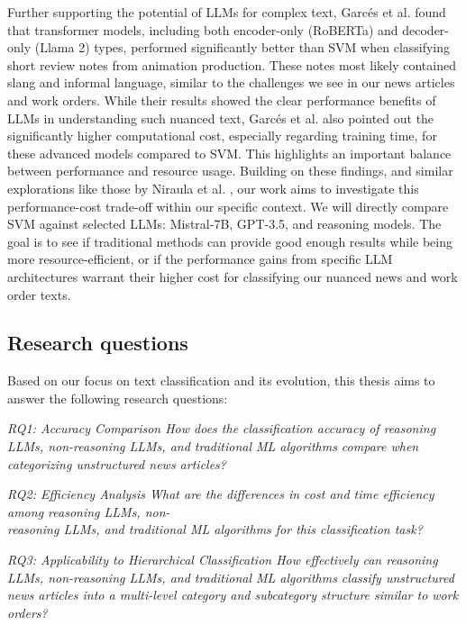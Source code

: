 Further supporting the potential of LLMs for complex text, Garcés et al. \cite{garces2025leveraging} found that transformer models, including both encoder-only (RoBERTa) and decoder-only (Llama 2) types, performed significantly better than SVM when classifying short review notes from animation production. These notes most likely contained slang and informal language, similar to the challenges we see in our news articles and work orders. While their results showed the clear performance benefits of LLMs in understanding such nuanced text, Garcés et al. also pointed out the significantly higher computational cost, especially regarding training time, for these advanced models compared to SVM. This highlights an important balance between performance and resource usage. Building on these findings, and similar explorations like those by Niraula et al. \cite{niraula2024multi}, our work aims to investigate this performance-cost trade-off within our specific context. We will directly compare SVM against selected LLMs: Mistral-7B, GPT-3.5, and reasoning models. The goal is to see if traditional methods can provide good enough results while being more resource-efficient, or if the performance gains from specific LLM architectures warrant their higher cost for classifying our nuanced news and work order texts.

\subsection{Research questions}

Based on our focus on text classification and its evolution, this thesis aims to answer the following research questions:

\bigskip
\textit{RQ1: Accuracy Comparison
\newline
How does the classification accuracy of reasoning LLMs, non-reasoning LLMs, and traditional ML algorithms compare when categorizing unstructured news articles?}

\bigskip
\textit{RQ2: Efficiency Analysis
\newline
What are the differences in cost and time efficiency among reasoning LLMs, non-\\reasoning LLMs, and traditional ML algorithms for this classification task?}

\bigskip
\textit{RQ3: Applicability to Hierarchical Classification
\newline
How effectively can reasoning LLMs, non-reasoning LLMs, and traditional ML algorithms classify unstructured news articles into a multi-level category and subcategory structure similar to work orders?}

